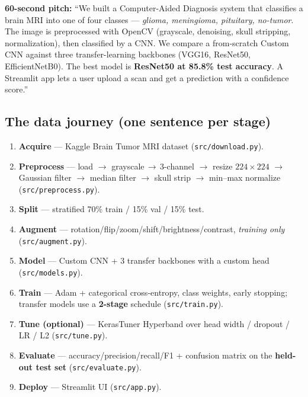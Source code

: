 \documentclass[11pt,a4paper]{article}
\newcommand{\code}[1]{\colorbox{codebg}{\small\texttt{#1}}}
\begin{document}
\begin{keybox}
\textbf{60-second pitch:} ``We built a Computer-Aided Diagnosis system that classifies a
brain MRI into one of four classes --- \emph{glioma, meningioma, pituitary, no-tumor}.
The image is preprocessed with OpenCV (grayscale, denoising, skull stripping,
normalization), then classified by a CNN. We compare a from-scratch Custom CNN against
three transfer-learning backbones (VGG16, ResNet50, EfficientNetB0). The best model is
\textbf{ResNet50 at 85.8\% test accuracy}. A Streamlit app lets a user upload a scan and
get a prediction with a confidence score.''
\end{keybox}

\subsection*{The data journey (one sentence per stage)}
\begin{enumerate}[leftmargin=*,itemsep=2pt]
  \item \textbf{Acquire} --- Kaggle Brain Tumor MRI dataset (\code{src/download.py}).
  \item \textbf{Preprocess} --- load $\rightarrow$ grayscale\,$\to$\,3-channel $\rightarrow$ resize $224\times224$ $\rightarrow$ Gaussian filter $\rightarrow$ median filter $\rightarrow$ skull strip $\rightarrow$ min--max normalize (\code{src/preprocess.py}).
  \item \textbf{Split} --- stratified 70\% train / 15\% val / 15\% test.
  \item \textbf{Augment} --- rotation/flip/zoom/shift/brightness/contrast, \emph{training only} (\code{src/augment.py}).
  \item \textbf{Model} --- Custom CNN + 3 transfer backbones with a custom head (\code{src/models.py}).
  \item \textbf{Train} --- Adam + categorical cross-entropy, class weights, early stopping; transfer models use a \textbf{2-stage} schedule (\code{src/train.py}).
  \item \textbf{Tune (optional)} --- KerasTuner Hyperband over head width / dropout / LR / L2 (\code{src/tune.py}).
  \item \textbf{Evaluate} --- accuracy/precision/recall/F1 + confusion matrix on the \textbf{held-out test set} (\code{src/evaluate.py}).
  \item \textbf{Deploy} --- Streamlit UI (\code{src/app.py}).
\end{enumerate}

\end{document}
